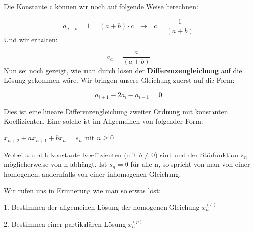 \begin{uebsp}
\begin{Answer}

{
Die Konstante c k\"onnen wir noch auf folgende Weise berechnen:}



\begin{equation*}
a_{a+b}=1=(a+b)\cdot c\text{   }\rightarrow \text{   }c=\frac{1}{(a+b)}
\end{equation*}
{
Und wir erhalten:}



\begin{equation*}
a_{a}=\frac{a}{(a+b)}
\end{equation*}
{
Nun sei noch gezeigt, wie man durch l\"osen der \textbf{Differenzengleichung} auf
die L\"osung gekommen w\"are. Wir bringen unsere Gleichung zuerst auf
die Form:}



\begin{equation*}
a_{i+1}-2a_{i}-a_{i-1}=0
\end{equation*}




{
Dies ist eine lineare Differenzengleichung zweiter Ordnung mit
konstanten Koeffizienten. Eine solche ist im Allgemeinen von folgender
Form:}



{
 $x_{n+2}+\mathit{ax}_{n+1}+\mathit{bx}_{n}=s_{n}$  mit  $n\geqslant 0$
}



{
Wobei a und b konstante Koeffizienten (mit  $b\neq 0$) sind und der
St\"orfunktion  $s_{n}$ m\"oglicherweise von n abh\"angt. Ist 
$s_{n}=0$ f\"ur alle n, so spricht von man von einer homogenen,
andernfalls von einer inhomogenen Gleichung.}



{
Wir rufen uns in Erinnerung wie man so etwas l\"ost:}



{
1. Bestimmen der allgemeinen L\"osung der homogenen Gleichung 
$x_{n}^{(h)}$ }

{
2. Bestimmen einer partikul\"aren L\"osung  $x_{n}^{(p)}$ }


\end{Answer}
\end{uebsp}
